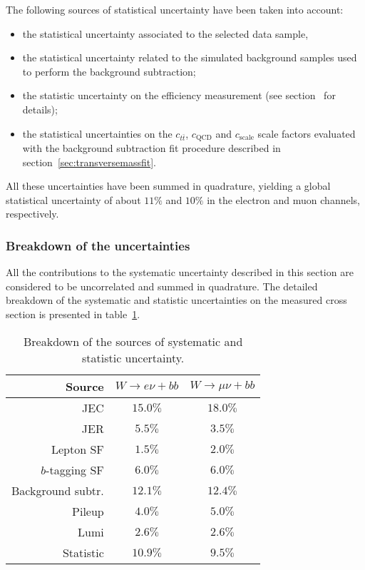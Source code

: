 The following sources of statistical uncertainty have been taken into account: 
\begin{itemize}
  \item the statistical uncertainty associated to the selected data sample,
  \item the statistical uncertainty related to the simulated background samples 
    used to perform the background subtraction;
  \item the statistic uncertainty on the efficiency measurement 
    (see section~ for details);
  \item the statistical uncertainties on the $c_{t\bar{t}}$, 
    $c_{\mathrm{QCD}}$ and $c_{\mathrm{scale}}$ scale factors evaluated with 
    the background subtraction fit procedure described in section~\ref{sec:transversemassfit}.
\end{itemize}
All these uncertainties have been summed in quadrature, yielding a global statistical
uncertainty of about $11\%$ and $10\%$ in
the electron and muon channels, respectively.

\subsubsection{Breakdown of the uncertainties}

All the contributions to the systematic uncertainty described in this section are considered 
to be uncorrelated and summed in quadrature.
The detailed breakdown of the systematic and statistic uncertainties on the measured
cross section is presented in
table~\ref{tab:finalxsectab}.

\begin{table}[htb]
\begin{center}
\begin{tabular}{|r|c|c|}
\hline
\textbf{Source} & $W \rightarrow e \nu + bb$ & $W \rightarrow \mu \nu + bb$ \\ 
\hline
JEC                & $15.0\%$  & $18.0\%$ \\ 
JER                & $5.5\%$   & $3.5\%$ \\ 
Lepton SF          & $1.5\%$   & $2.0\%$ \\ 
$b$-tagging SF     & $6.0\%$   & $6.0\%$ \\ 
Background subtr.  & $12.1\%$  & $12.4\%$ \\ 
Pileup             & $4.0\%$   & $5.0\%$ \\ 
Lumi               & $2.6\%$   & $2.6\%$ \\ 
\hline \hline
Statistic          & $10.9\%$   & $9.5\%$ \\ 
\hline
\end{tabular}
\end{center}
\caption{Breakdown of the sources of systematic and statistic uncertainty.} 
\label{tab:finalxsectab}
\end{table}


